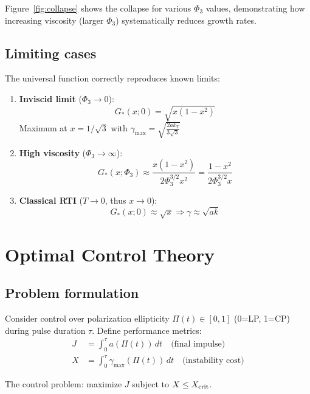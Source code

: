 \documentclass[aps,pre,twocolumn,showpacs,superscriptaddress]{revtex4-2}
\theoremstyle{definition}
\begin{document}
Figure~\ref{fig:collapse} shows the collapse for various $\Phi_3$ values, demonstrating how increasing viscosity (larger $\Phi_3$) systematically reduces growth rates.

\subsection{Limiting cases}

The universal function correctly reproduces known limits:

\begin{enumerate}
\item \textbf{Inviscid limit} ($\Phi_3 \to 0$):
\begin{equation}
G_*(x;0) = \sqrt{x(1-x^2)}
\end{equation}
Maximum at $x = 1/\sqrt{3}$ with $\gamma_{\max} = \sqrt{\frac{2ak_T}{3\sqrt{3}}}$

\item \textbf{High viscosity} ($\Phi_3 \to \infty$):
\begin{equation}
G_*(x;\Phi_3) \approx \frac{x(1-x^2)}{2\Phi_3^{3/2}x^2} = \frac{1-x^2}{2\Phi_3^{3/2}x}
\end{equation}

\item \textbf{Classical RTI} ($T \to 0$, thus $x \to 0$):
\begin{equation}
G_*(x;0) \approx \sqrt{x} \Rightarrow \gamma \approx \sqrt{ak}
\end{equation}
\end{enumerate}

\section{Optimal Control Theory}\label{sec:control}

\subsection{Problem formulation}

Consider control over polarization ellipticity $\Pi(t) \in [0,1]$ (0=LP, 1=CP) during pulse duration $\tau$. Define performance metrics:
\begin{align}
J &= \int_0^\tau a(\Pi(t))\,dt \quad \text{(final impulse)} \\
X &= \int_0^\tau \gamma_{\max}(\Pi(t))\,dt \quad \text{(instability cost)}
\end{align}

The control problem: maximize $J$ subject to $X \leq X_{\rm crit}$.
\end{document}

